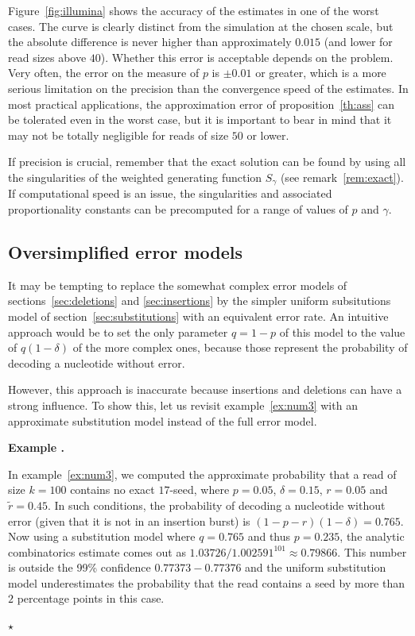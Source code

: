 \documentclass{article}
\newcounter{examplecounter}
\newenvironment{example}
{\small\vspace{0.5\baselineskip}
  \refstepcounter{examplecounter}%
  \noindent\textbf{Example \arabic{examplecounter}.}%
}{\vspace{-0.2\baselineskip}\begin{center}%
  $\star$\end{center}\vspace{0.5\baselineskip}}
\begin{document}
Figure~\ref{fig:illumina} shows the accuracy of the estimates in one of
the worst cases. The curve is clearly distinct from the simulation at the
chosen scale, but the absolute difference is never higher than
approximately $0.015$ (and lower for read sizes above $40$). Whether this
error is acceptable depends on the problem. Very often, the error on the
measure of $p$ is $\pm 0.01$ or greater, which is a more serious
limitation on the precision than the convergence speed of the estimates.
In most practical applications, the approximation error of
proposition~\ref{th:ass} can be tolerated even in the worst case, but it
is important to bear in mind that it may not be totally negligible for
reads of size $50$ or lower.

If precision is crucial, remember that the exact solution can be found by
using all the singularities of the weighted generating function $S_\gamma$
(see remark~\ref{rem:exact}). If computational speed is an issue, the
singularities and associated proportionality constants can be precomputed
for a range of values of $p$ and $\gamma$.



\subsection{Oversimplified error models}

It may be tempting to replace the somewhat complex error models of
sections~\ref{sec:deletions} and \ref{sec:insertions} by the simpler
uniform subsitutions model of section~\ref{sec:substitutions} with an
equivalent error rate. An intuitive approach would be to set the only
parameter $q = 1-p$ of this model to the value of $q(1-\delta)$ of the
more complex ones, because those represent the probability of decoding a
nucleotide without error.

However, this approach is inaccurate because insertions and deletions can
have a strong influence. To show this, let us revisit
example~\ref{ex:num3} with an approximate substitution model instead of
the full error model.

\begin{example}
\label{ex:num4}
In example~\ref{ex:num3}, we computed the approximate probability that a
read of size $k=100$ contains no exact $17$-seed, where $p=0.05$,
$\delta=0.15$, $r=0.05$ and $\tilde{r}=0.45$. In such conditions, the
probability of decoding a nucleotide without error (given that it is not
in an insertion burst) is $(1-p-r)(1-\delta) =
0.765$. Now using a substitution model where $q = 0.765$ and thus $p =
0.235$, the analytic combinatorics estimate comes out as
$1.03726/1.002591^{101} \approx 0.79866$. This number is outside the 99\%
confidence $0.77373-0.77376$ and the uniform substitution model
underestimates the probability that the read contains a seed by more
than $2$ percentage points in this case.
\end{example}
\end{document}
